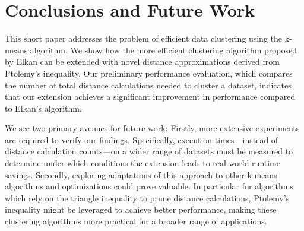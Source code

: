 \section{Conclusions and Future Work} \label{sec: conclusions}
This short paper addresses the problem of efficient data clustering using the k-means algorithm.
We show how the more efficient clustering algorithm proposed by Elkan can be extended with novel distance approximations derived from Ptolemy's inequality.
Our preliminary performance evaluation, which compares the number of total distance calculations needed to cluster a dataset, indicates that our extension achieves a significant improvement in performance compared to Elkan's algorithm.

We see two primary avenues for future work:
Firstly, more extensive experiments are required to verify our findings.
Specifically, execution times---instead of distance calculation counts---on a wider range of datasets must be measured to determine under which conditions the extension leads to real-world runtime savings.
Secondly, exploring adaptations of this approach to other k-means algorithms and optimizations could prove valuable.
In particular for algorithms which rely on the triangle inequality to prune distance calculations, Ptolemy's inequality might be leveraged to achieve better performance, making these clustering algorithms more practical for a broader range of applications.






